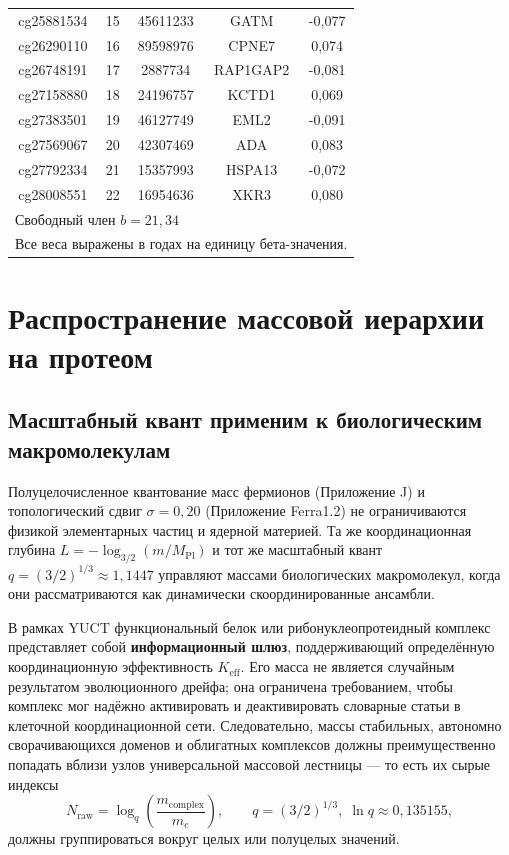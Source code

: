 \documentclass[12pt,a4paper]{article}
\begin{document}
\begin{longtable}{|c|c|c|c|c|}
		cg25881534 & 15 & 45611233 & GATM & -0,077 \\
		cg26290110 & 16 & 89598976 & CPNE7 & 0,074 \\
		cg26748191 & 17 & 2887734 & RAP1GAP2 & -0,081 \\
		cg27158880 & 18 & 24196757 & KCTD1 & 0,069 \\
		cg27383501 & 19 & 46127749 & EML2 & -0,091 \\
		cg27569067 & 20 & 42307469 & ADA & 0,083 \\
		cg27792334 & 21 & 15357993 & HSPA13 & -0,072 \\
		cg28008551 & 22 & 16954636 & XKR3 & 0,080 \\
		\hline
		\multicolumn{5}{l}{\footnotesize Свободный член \(b = 21,34\)} \\
		\multicolumn{5}{l}{\footnotesize Все веса выражены в годах на единицу бета-значения.} \\
	\end{longtable}
	
	\section{Распространение массовой иерархии на протеом}
	\label{sec:protein_hierarchy}
	
	\subsection{Масштабный квант применим к биологическим макромолекулам}
	
	Полуцелочисленное квантование масс фермионов (Приложение J) и топологический сдвиг \(\sigma = 0,20\) (Приложение Ferra1.2) не ограничиваются физикой элементарных частиц и ядерной материей. Та же координационная глубина \(L = -\log_{3/2}(m/M_{\mathrm{Pl}})\) и тот же масштабный квант \(q = (3/2)^{1/3} \approx 1,1447\) управляют массами биологических макромолекул, когда они рассматриваются как динамически скоординированные ансамбли.
	
	В рамках YUCT функциональный белок или рибонуклеопротеидный комплекс представляет собой \textbf{информационный шлюз}, поддерживающий определённую координационную эффективность \(K_{\mathrm{eff}}\). Его масса не является случайным результатом эволюционного дрейфа; она ограничена требованием, чтобы комплекс мог надёжно активировать и деактивировать словарные статьи в клеточной координационной сети. Следовательно, массы стабильных, автономно сворачивающихся доменов и облигатных комплексов должны преимущественно попадать вблизи узлов универсальной массовой лестницы — то есть их сырые индексы
	\[
	N_{\mathrm{raw}} = \log_q\!\left(\frac{m_{\mathrm{complex}}}{m_e}\right),
	\qquad q = (3/2)^{1/3},\; \ln q \approx 0,135155,
	\]
	должны группироваться вокруг целых или полуцелых значений.
	
\end{document}
